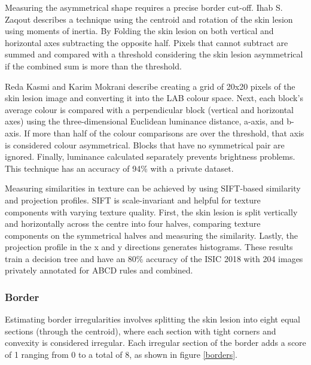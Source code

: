 Measuring the asymmetrical shape requires a precise border cut-off. Ihab S. Zaqout\cite{Zaqout2016} describes a technique using the centroid and rotation of the skin lesion using moments of inertia. By Folding the skin lesion on both vertical and horizontal axes subtracting the opposite half. Pixels that cannot subtract are summed and compared with a threshold considering the skin lesion asymmetrical if the combined sum is more than the threshold.

Reda Kasmi and Karim Mokrani\cite{Kasmi2016} describe creating a grid of 20x20 pixels of the skin lesion image and converting it into the LAB colour space. Next, each block's average colour is compared with a perpendicular block (vertical and horizontal axes) using the three-dimensional Euclidean luminance distance, a-axis, and b-axis. If more than half of the colour comparisons are over the threshold, that axis is considered colour asymmetrical. Blocks that have no symmetrical pair are ignored. Finally, luminance calculated separately prevents brightness problems. This technique has an accuracy of 94\% with a private dataset.

Measuring similarities in texture can be achieved by using SIFT-based similarity and projection profiles\cite{Ali2020a}. SIFT is scale-invariant and helpful for texture components with varying texture quality. First, the skin lesion is split vertically and horizontally across the centre into four halves, comparing texture components on the symmetrical halves and measuring the similarity. Lastly, the projection profile in the x and y directions generates histograms. These results train a decision tree and have an 80\% accuracy of the ISIC 2018 with 204 images privately annotated for ABCD rules and combined.

\subsubsection{Border}
Estimating border irregularities involves splitting the skin lesion into eight equal sections (through the centroid), where each section with tight corners and convexity is considered irregular. Each irregular section of the border adds a score of 1 ranging from 0 to a total of 8, as shown in figure \ref{borders}.

